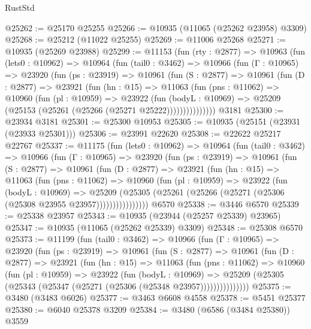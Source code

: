 \begin{lexlean}{RustStd}
\begin{coremodule}
{\begin{coremodule}
{{{{{{{{{{{{{{{{{{{{{{{{{{{{{{{{{{{{{{{{{{{{{{{{{{{{{{{{{{{{{{{{{{{{{{{{{{{{{{{{{{{{{@25262 := @25170 @25255
@25266 := @10935 (@11065 (@25262 @23958) @3309)
@25268 := @25212 (@11022 @25255)
@25269 := @11006 @25268
@25271 := @10935 (@25269 @23988)
@25299 := @11153
    (fun (rty : @2877) =>
    @10963
      (fun (lets0 : @10962) =>
      @10964
        (fun (tail0 : @3462) =>
        @10966
          (fun (Γ : @10965) =>
          @23920
            (fun (ps : @23919) =>
            @10961
              (fun (S : @2877) =>
              @10961
                (fun (D : @2877) =>
                @23921
                  (fun (hn : @15) =>
                  @11063
                    (fun (pns : @11062) =>
                    @10960
                      (fun (pl : @10959) =>
                      @23922
                        (fun (bodyL : @10969) =>
                        @25209 (@25153 (@25261 (@25266 (@25271 @25222)))))))))))))))
    @3181
@25300 := @23934 @3181
@25301 := @25300 @10953
@25305 := @10935 (@25151 (@23931 (@23933 @25301)))
@25306 := @23991 @22620
@25308 := @22622 @25217 @22767
@25337 := @11175
    (fun (lets0 : @10962) =>
    @10964
      (fun (tail0 : @3462) =>
      @10966
        (fun (Γ : @10965) =>
        @23920
          (fun (ps : @23919) =>
          @10961
            (fun (S : @2877) =>
            @10961
              (fun (D : @2877) =>
              @23921
                (fun (hn : @15) =>
                @11063
                  (fun (pns : @11062) =>
                  @10960
                    (fun (pl : @10959) =>
                    @23922
                      (fun (bodyL : @10969) =>
                      @25209
                        (@25305
                          (@25261 (@25266 (@25271 (@25306 (@25308 @23955 @23957))))))))))))))))
    @6570
@25338 := @3446 @6570
@25339 := @25338 @23957
@25343 := @10935 (@23944 (@25257 @25339) @23965)
@25347 := @10935 (@11065 (@25262 @25339) @3309)
@25348 := @25308 @6570
@25373 := @11199
    (fun (tail0 : @3462) =>
    @10966
      (fun (Γ : @10965) =>
      @23920
        (fun (ps : @23919) =>
        @10961
          (fun (S : @2877) =>
          @10961
            (fun (D : @2877) =>
            @23921
              (fun (hn : @15) =>
              @11063
                (fun (pns : @11062) =>
                @10960
                  (fun (pl : @10959) =>
                  @23922
                    (fun (bodyL : @10969) =>
                    @25209 (@25305 (@25343 (@25347 (@25271 (@25306 (@25348 @23957)))))))))))))))
@25375 := @3480 (@3483 @6026)
@25377 := @3463 @6608 @4558
@25378 := @5451 @25377
@25380 := @6040 @25378 @3209
@25384 := @3480 (@6586 (@3484 @25380)) @3559
}}}}}}}}}}}}}}}}}}}}}}}}}}}}}}}}}}}}}}}}}}}}}}}}}}}}}}}}}}}}}}}}}}}}}}}}}}}}}}}}}}}}}
\end{coremodule}}
\end{coremodule}
\end{lexlean}
